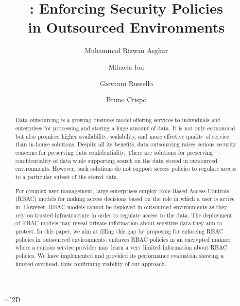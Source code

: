 \documentclass[final,5p,times,twocolumn]{elsarticle}
\begin{document}





\mathchardef\mhyphen="2D

\begin{frontmatter}





\title{: Enforcing Security Policies \\ in Outsourced Environments}



\author[cn,disi]{Muhammad Rizwan Asghar}
\author[cn,disi]{Mihaela Ion}
\author[nz]{Giovanni Russello}
\author[disi]{Bruno Crispo}


\address[cn]{CREATE-NET, International Research Center, Trento Italy}

\address[nz]{Department of Computer Science, The University of Auckland, Auckland New Zealand}

\address[disi]{Department of Information Engineering and Computer Science, University of Trento, Trento Italy}


\begin{abstract}

Data outsourcing is a growing business model offering services to individuals and enterprises for processing and storing a huge amount of data. It is not only economical but also promises higher availability, scalability, and more effective quality of service than in-house solutions. Despite all its benefits, data outsourcing raises serious security concerns for preserving data confidentiality. There are solutions for preserving confidentiality of data while supporting search on the data stored in outsourced environments. However, such solutions do not support access policies to regulate access to a particular subset of the stored data. 

For complex user management, large enterprises employ Role-Based Access Controls (RBAC) models for making access decisions based on the role in which a user is active in. However, RBAC models cannot be deployed in outsourced environments as they rely on trusted infrastructure in order to regulate access to the data. The deployment of RBAC models may reveal private information about sensitive data they aim to protect. In this paper, we aim at filling this gap by proposing \textbf{} for enforcing RBAC policies in outsourced environments.  enforces RBAC policies in an encrypted manner where a curious service provider may learn a very limited information about RBAC policies. We have implemented  and provided its performance evaluation showing a limited overhead, thus confirming viability of our approach.


\end{abstract}
\end{frontmatter}
\end{document}
